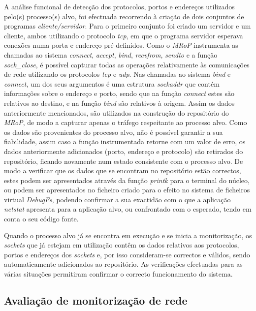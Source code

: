 A análise funcional de detecção dos protocolos, portos e endereços utilizados pelo(s) processo(s) alvo, foi efectuada recorrendo à criação de dois conjuntos de programas \textit{cliente/servidor}.
Para o primeiro conjunto foi criado um servidor e um cliente, ambos utilizando o protocolo \textit{tcp}, em que o programa servidor esperava conexões numa porta e endereço pré-definidos.
Como o \textit{MRoP} instrumenta as chamadas ao sistema \textit{connect}, \textit{accept}, \textit{bind}, \textit{recvfrom}, \textit{sendto} e a função \textit{sock\_close}, é possível capturar todas as operações relativamente às comunicações de rede utilizando os protocolos \textit{tcp} e \textit{udp}.
Nas chamadas ao sistema \textit{bind} e \textit{connect}, um dos seus argumentos é uma estrutura \textit{sockaddr} que contém informações sobre o endereço e porto, sendo que na função \textit{connect} estes são relativos ao destino, e na função \textit{bind} são relativos à origem.
Assim os dados anteriormente mencionados, são utilizados na construção do repositório do \textit{MRoP}, de modo a capturar apenas o tráfego respeitante ao processo alvo.
Como os dados são provenientes do processo alvo, não é possível garantir a sua fiabilidade, assim caso a função instrumentada retorne com um valor de erro, os dados anteriormente adicionados (porto, endereço e protocolo) são retirados do repositório, ficando novamente num estado consistente com o processo alvo.
De modo a verificar que os dados que se encontram no repositório estão correctos, estes podem ser apresentados através da função \textit{printk} para o terminal do núcleo, ou podem ser apresentados no ficheiro criado para o efeito no sistema de ficheiros virtual \textit{DebugFs}, podendo confirmar a sua exactidão com o que a aplicação \textit{netstat} apresenta para a aplicação alvo, ou confrontado com o esperado, tendo em conta o seu código fonte.

Quando o processo alvo já se encontra em execução e se inicia a monitorização, os \textit{sockets} que já estejam em utilização contêm os dados relativos aos protocolos, portos e endereços dos \textit{sockets} e, por isso consideram-se correctos e válidos, sendo automaticamente adicionados ao repositório.
As verificações efectuadas para as várias situações permitiram confirmar o correcto funcionamento do sistema.

\subsection{Avaliação de monitorização de rede}

